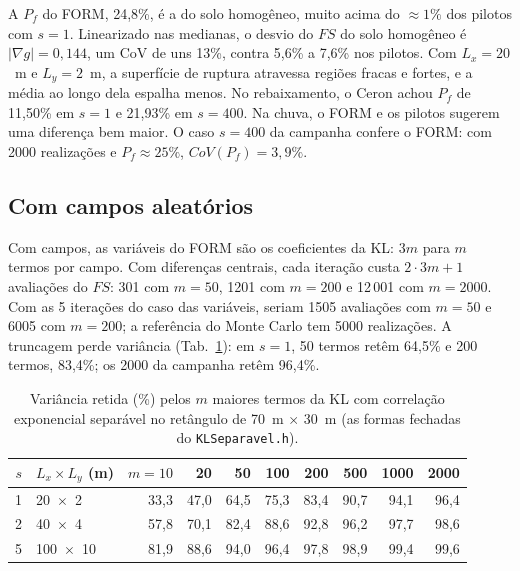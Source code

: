 \documentclass[11pt,a4paper]{article}
\begin{document}
A $P_f$ do FORM, 24,8\%, é a do solo homogêneo, muito acima do $\approx 1\%$ dos pilotos com $s = 1$. Linearizado nas
medianas, o desvio do $FS$ do solo homogêneo é $|\nabla g| = 0{,}144$, um CoV de uns 13\%, contra 5,6\% a 7,6\% nos
pilotos. Com $L_x = 20$~m e $L_y = 2$~m, a superfície de ruptura atravessa regiões fracas e fortes, e a média ao longo
dela espalha menos. No rebaixamento, o Ceron achou $P_f$ de 11,50\% em $s = 1$ e 21,93\% em $s = 400$. Na chuva, o FORM
e os pilotos sugerem uma diferença bem maior. O caso $s = 400$ da campanha confere o FORM: com 2000 realizações e $P_f \approx 25\%$,
$CoV(P_f) = 3{,}9\%$.

\subsection{Com campos aleatórios}
Com campos, as variáveis do FORM são os coeficientes da KL: $3m$ para $m$ termos por campo. Com diferenças centrais, cada
iteração custa $2 \cdot 3m + 1$ avaliações do $FS$: 301 com $m = 50$, 1201 com $m = 200$ e 12\,001 com $m = 2000$. Com as
5 iterações do caso das variáveis, seriam 1505 avaliações com $m = 50$ e 6005 com $m = 200$; a referência do Monte
Carlo tem 5000 realizações. A truncagem perde variância
(Tab.~\ref{tab:kl}): em $s = 1$, 50 termos retêm 64,5\% e 200 termos, 83,4\%; os 2000 da campanha retêm 96,4\%.

\begin{table}[htbp]\centering\footnotesize
\caption{Variância retida (\%) pelos $m$ maiores termos da KL com correlação exponencial separável no retângulo de 70~m
$\times$ 30~m (as formas fechadas do \texttt{KLSeparavel.h}).}\label{tab:kl}
\begin{tabular}{rlrrrrrrrr}\toprule
$s$ & $L_x \times L_y$ (m) & $m = 10$ & 20 & 50 & 100 & 200 & 500 & 1000 & 2000 \\\midrule
1 & 20~$\times$~2 & 33,3 & 47,0 & 64,5 & 75,3 & 83,4 & 90,7 & 94,1 & 96,4 \\
2 & 40~$\times$~4 & 57,8 & 70,1 & 82,4 & 88,6 & 92,8 & 96,2 & 97,7 & 98,6 \\
5 & 100~$\times$~10 & 81,9 & 88,6 & 94,0 & 96,4 & 97,8 & 98,9 & 99,4 & 99,6 \\
\bottomrule\end{tabular}\end{table}
\end{document}
